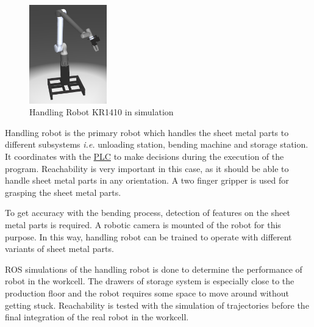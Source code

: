 \begin{figure}[h]
    \centering
    \includegraphics[width=0.3\textwidth]{figures/handling-robot-simulation.png}
    \caption{Handling Robot KR1410 in simulation}
    \label{fig:handling-robot-simulation}
\end{figure}
Handling robot is the primary robot which handles the sheet metal parts to different subsystems \textit{i.e.}
unloading station, bending machine and storage station.
It coordinates with the \hyperref[acro:PLC]{PLC} to make decisions during the execution of the program. Reachability
is very important in this case, as it should be able to handle sheet metal parts in any orientation.
A two finger gripper is used for grasping the sheet metal parts.

To get accuracy with the bending process, detection of features on the sheet metal parts is required.
A robotic camera is mounted of the robot for this purpose. In this way, handling robot can be trained 
to operate with different variants of sheet metal parts.

ROS simulations of the handling robot is done to determine the performance of robot in the workcell.
The drawers of storage system is especially close
to the production floor and the robot requires some space to move around without getting stuck. 
Reachability is tested with the simulation of trajectories before the final integration of the real robot
in the workcell.